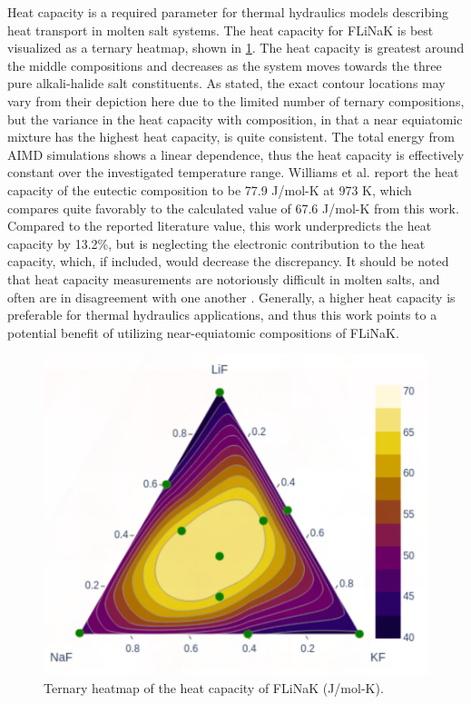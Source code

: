 \documentclass[preprint,12pt]{elsarticle}
\begin{document}
Heat capacity is a required parameter for thermal hydraulics models describing heat transport in molten salt systems\cite{freile2019}. The heat capacity for FLiNaK is best visualized as a ternary heatmap, shown in \cref{fig:Cp}. The heat capacity is greatest around the middle compositions and decreases as the system moves towards the three pure alkali-halide salt constituents. As stated, the exact contour locations may vary from their depiction here due to the limited number of ternary compositions, but the variance in the heat capacity with composition, in that a near equiatomic mixture has the highest heat capacity, is quite consistent. The total energy from AIMD simulations shows a linear dependence, thus the heat capacity is effectively constant over the investigated temperature range. Williams et al. report the heat capacity of the eutectic composition to be 77.9 J/mol-K at 973 K\cite{williams2006Cp}, which compares quite favorably to the calculated value of 67.6 J/mol-K from this work. Compared to the reported literature value, this work underpredicts the heat capacity by 13.2\%, but is neglecting the electronic contribution to the heat capacity, which, if included, would decrease the discrepancy. It should be noted that heat capacity measurements are notoriously difficult in molten salts, and often are in disagreement with one another \cite{robertson2022}. Generally, a higher heat capacity is preferable for thermal hydraulics applications, and thus this work points to a potential benefit of utilizing near-equiatomic compositions of FLiNaK. 

\begin{figure}[!ht]
    \centering
    \includegraphics[width=.7\textwidth]{heatCapacity_withScatter.png}
    \caption{Ternary heatmap of the heat capacity of FLiNaK (J/mol-K).}
    \label{fig:Cp}
\end{figure}
\end{document}
